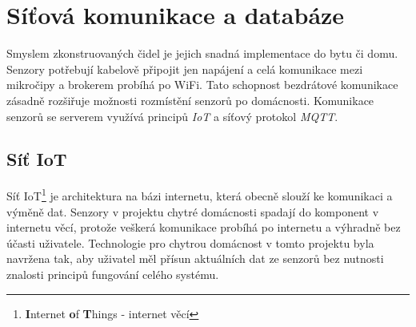 \chapter{Síťová komunikace a databáze} \label{chap:methods}
Smyslem zkonstruovaných čidel je jejich snadná implementace do bytu či domu. Senzory potřebují kabelově připojit jen napájení a celá komunikace mezi mikročipy a brokerem probíhá po WiFi. Tato schopnost bezdrátové komunikace zásadně rozšiřuje možnosti rozmístění senzorů po domácnosti. Komunikace senzorů se serverem využívá principů \textit{IoT} a síťový protokol \textit{MQTT}. 

\section*{Síť IoT} \label{sec:iot}
Síť IoT\footnote{\textbf{I}nternet \textbf{o}f \textbf{T}hings - internet věcí} je architektura na bázi internetu, která obecně slouží ke komunikaci a výměně dat. Senzory v projektu chytré domácnosti spadají do komponent v internetu věcí, protože veškerá komunikace probíhá po internetu a výhradně bez účasti uživatele. Technologie pro chytrou domácnost v tomto projektu byla navržena tak, aby uživatel měl přísun aktuálních dat ze senzorů bez nutnosti znalosti principů fungování celého systému.


